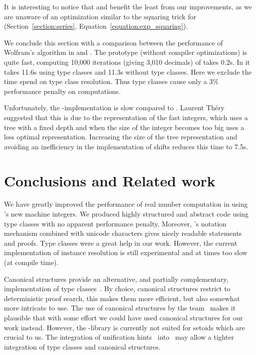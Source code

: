 \documentclass[a4paper,10pt,runningheads]{llncs}
\begin{document}
It is interesting to notice that  and \arctan{} benefit the least from our improvements, as we are unaware of an optimization similar to the squaring trick for \exp{} (Section~\ref{section:series}, Equation~\ref{equation:exp_squaring}).

We conclude this section with a comparison between the performance of Wolfram's algorithm in \Coq{} and \Haskell. The \Haskell{} prototype (without compiler optimizations) is quite fast, computing 10,000 iterations (giving 3,010 decimals) of  takes 0.2s. In \Coq{} it takes 11.6s using type classes and 11.3s without type classes. Here we exclude the time spend on type class resolution. Thus type classes cause only a 3\% performance penalty on computations.

Unfortunately, the \Coq-implementation is slow compared to \Haskell. Laurent Théry suggested that this is due to the representation of the fast integers, which uses a tree with a fixed depth and when the size of the integer becomes too big uses a less optimal representation. Increasing the size of the tree representation and avoiding an inefficiency in the implementation of shifts reduces this time to 7.5s.

\section{Conclusions and Related work}
We have greatly improved the performance of real number computation in \Coq{} using \Coq's new machine integers. We produced highly structured and abstract code using type classes with no apparent performance penalty. Moreover, \Coq's notation mechanism combined with unicode characters gives nicely readable statements and proofs. Type classes were a great help in our work. However, the current implementation of instance resolution is still experimental and at times too slow (at compile time).

Canonical structures provide an alternative, and partially complementary, implementation of type classes~\cite{adhoc}. By choice, canonical structures restrict to deterministic proof search, this makes them more efficient, but also somewhat more intricate to use. The use of canonical structures by the \Ssreflect{} team~\cite{packed} makes it plausible that with some effort we could have used canonical structures for our work instead. However, the \Ssreflect-library is currently not suited for setoids which are crucial to us. The integration of unification hints~\cite{Hints} into \Coq\ may allow a tighter integration of type classes and canonical structures.
\end{document}
